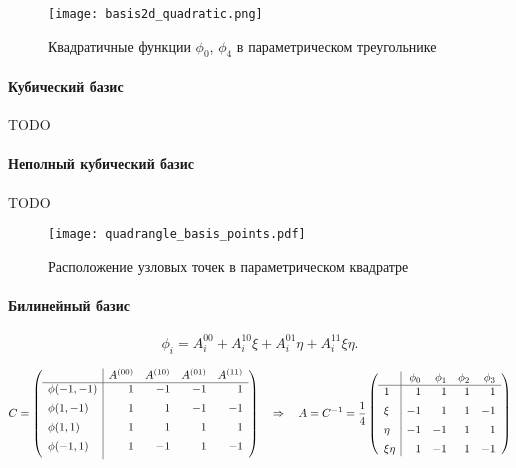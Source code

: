 \begin{figure}[h!]
\centering
\texttt{[image: basis2d\_quadratic.png]}
\caption{Квадратичные функции $\phi_0$, $\phi_4$ в параметрическом треугольнике}
\label{fig:basis2d_quadratic}
\end{figure}

\paragraph{Кубический базис}
TODO

\paragraph{Неполный кубический базис}
TODO

\begin{figure}[h!]
\centering
\texttt{[image: quadrangle\_basis\_points.pdf]}
\caption{Расположение узловых точек в параметрическом квадратре}
\label{fig:quadrangle_basis_points}
\end{figure}

\paragraph{Билинейный базис}
\begin{equation*}
\phi_i = A^{00}_i + A^{10}_i \xi + A^{01}_i \eta + A^{11}_i \xi\eta.
\end{equation*}

\begin{equation*}
C = \left(
\begin{array}{l|rrrr}
                      & A^{(00)} & A^{(10)} & A^{(01)} & A^{(11)} \\
\hline
\phi(-1, -1) & 1 & -1  & -1   &  1      \\[5pt] 
\phi( 1, -1) & 1 &  1  & -1   & -1      \\[5pt]
\phi( 1,  1) & 1 &  1  &  1   &  1      \\[5pt]
\phi(-1,  1) & 1 & -1  &  1   & -1      \\[5pt]
\end{array}
\right)
\quad\Rightarrow\quad
A = C^{-1} = \frac14\left(
\begin{array}{l|rrrr}
        & \phi_0 & \phi_1 & \phi_2 & \phi_3\\
\hline
1       & 1 & 1 & 1 & 1\\[5pt]
\xi     & -1 & 1 & 1 & -1\\[5pt]
\eta    & -1 & -1 & 1 & 1\\[5pt]
\xi\eta & 1 & -1 & 1 & -1
\end{array}
\right)
\end{equation*}

